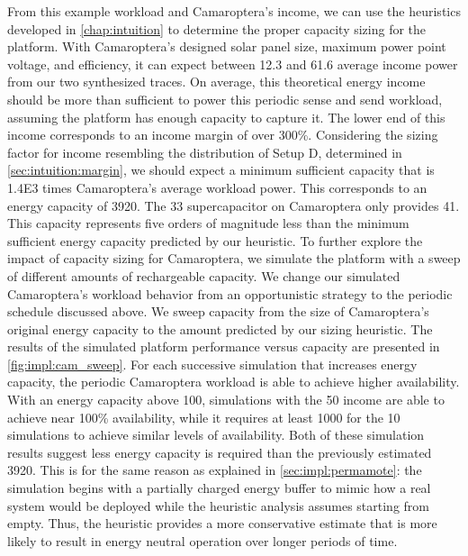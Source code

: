 From this example workload and Camaroptera's income, we can use the heuristics developed in \cref{chap:intuition} to determine the proper capacity sizing for the platform.
With Camaroptera's designed solar panel size, maximum power point voltage, and efficiency, 
it can expect between 12.3 and 61.6\ssi{\milli\watt} average income power from our two synthesized traces.
On average, this theoretical energy income should be more than sufficient to power this periodic sense and send workload, assuming the platform has enough capacity to capture it.
The lower end of this income corresponds to an income margin of over 300\%. 
Considering the sizing factor for income resembling the distribution of Setup D, determined in \cref{sec:intuition:margin}, we should expect a minimum sufficient capacity that is \num{1.4E3} times Camaroptera's average workload power. 
This corresponds to an energy capacity of 3920\ssi{\milli\Wh}. 
The 33\ssi{\milli\farad} supercapacitor on Camaroptera only provides 41\ssi{\micro\Wh}. This capacity represents five orders of magnitude less than the minimum sufficient energy capacity predicted by our heuristic.
To further explore the impact of capacity sizing for Camaroptera, we simulate the platform with a sweep of different amounts of rechargeable capacity. 
We change our simulated Camaroptera's workload behavior from an opportunistic strategy to the periodic schedule discussed above.
We sweep capacity from the size of Camaroptera's original energy capacity to the amount predicted by our sizing heuristic.
The results of the simulated platform performance versus capacity are presented in \cref{fig:impl:cam_sweep}.
For each successive simulation that increases energy capacity, the periodic Camaroptera workload is able to achieve higher availability.
With an energy capacity above 100\ssi{\milli\watt\hour}, simulations with the 50\ssi[per-mode=symbol]{\milli\watt\per\centi\meter\squared} income are able to achieve near 100\% availability, while it requires at least 1000\ssi{\milli\watt\hour} for the 10\ssi[per-mode=symbol]{\milli\watt\per\centi\meter\squared} simulations to achieve similar levels of availability. 
Both of these simulation results suggest less energy capacity is required than the previously estimated 3920\ssi{\milli\Wh}.
This is for the same reason as explained in \cref{sec:impl:permamote}: the simulation begins with a partially charged energy buffer to mimic how a real system would be deployed while the heuristic analysis assumes starting from empty.
Thus, the heuristic provides a more conservative estimate that is more likely to result in energy neutral operation over longer periods of time.

